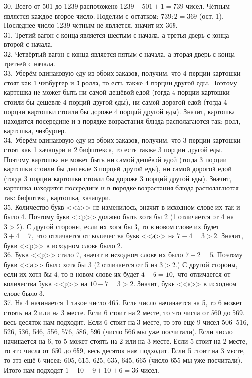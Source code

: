 30. Всего от 501 до 1239 расположено $1239-501+1=739$ чисел. Чётным является каждое второе число. Поделим с остатком: $739:2=369$ (ост. 1). Последнее число 1239 чётным не является, значит их 369.\\
31. Третий вагон с конца является шестым с начала, а третья дверь с конца --- второй с начала.\\
32. Четвёртый вагон с конца является пятым с начала, а вторая дверь с конца --- третьей с начала.\\
33. Уберём одинаковую еду из обоих заказов, получим, что 4 порции картошки стоят как 1 чизбургер и 3 ролла, то есть также 4 порции другой еды. Поэтому картошка не может быть ни самой дешёвой едой (тогда 4 порции картошки стоили бы дешевле 4 порций другой еды), ни самой дорогой едой (тогда 4 порции картошки стоили бы дороже 4 порций другой еды). Значит, картошка находится посередине и в порядке возрастания блюда располагаются так: ролл, картошка, чизбургер.\\
34. Уберём одинаковую еду из обоих заказов, получим, что 3 порции картошки стоят как 1 хачапури и 2 бифштекса, то есть также 3 порции другой еды. Поэтому картошка не может быть ни самой дешёвой едой (тогда 3 порции картошки стоили бы дешевле 3 порций другой еды), ни самой дорогой едой (тогда 3 порции картошки стоили бы дороже 3 порций другой еды). Значит, картошка находится посередине и в порядке возрастания блюда располагаются так: бифштекс, картошка, хачапури.\\
35. Количество букв <<а>> не изменилось, значит в исходном слове их так и было 4. Поэтому букв <<р>> должно быть хотя бы 2 (1 отличается от 4 на $3>2$). С другой стороны, если их хотя бы 3, то в новом слове их будет $3+4=7,$ что отличается от количества букв <<а>> на $7-4=3>2.$ Значит, букв <<р>> в исходном слове было 2.\\
36. Букв <<р>> стало 7, значит в исходном слове их было $7-2=5.$ Поэтому букв <<а>> было хотя бы 3 (2 отличается от 5 на $3>2.$) С другой стороны, если их хотя бы 4, то в новом слове  их будет $4+6=10,$ что отличается от количества букв <<р>> на $10-7=3>2.$ Значит, букв <<а>> в исходном слове было 3.\\
37. На 4 начинается 1 такое число 465. Если число начинается на 5, то 6 может стоять на 2 или на 3 месте. Если 6 стоит на 2 месте, то это числа от 560 до 569, весь десяток нам подходит. Если 6 стоит на 3 месте, то это ещё 9 чисел 506, 516, 526, 536, 546, 556, 576, 586, 596 (число 566 мы уже посчитали). Если число начинается на 6, то 5 может стоять на 2 или на 3 месте. Если 5 стоит на 2 месте, то это числа от 650 до 659, весь десяток нам подходит. Если 5 стоит на 3 месте, то это ещё 6 чисел: 605, 615, 625, 635, 645, 665 (число 655 мы уже посчитали). Итого нам подходят $1+10+9+10+6=36$ чисел.\\
